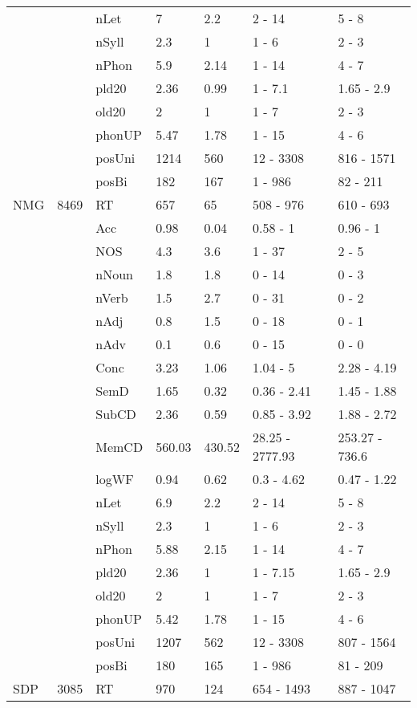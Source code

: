 \begin{table}[ht]
\begin{tabular}{lllllll}
   &  & nLet & 7 & 2.2 & 2 - 14 & 5 - 8 \\ 
   &  & nSyll & 2.3 & 1 & 1 - 6 & 2 - 3 \\ 
   &  & nPhon & 5.9 & 2.14 & 1 - 14 & 4 - 7 \\ 
   &  & pld20 & 2.36 & 0.99 & 1 - 7.1 & 1.65 - 2.9 \\ 
   &  & old20 & 2 & 1 & 1 - 7 & 2 - 3 \\ 
   &  & phonUP & 5.47 & 1.78 & 1 - 15 & 4 - 6 \\ 
   &  & posUni & 1214 & 560 & 12 - 3308 & 816 - 1571 \\ 
   &  & posBi & 182 & 167 & 1 - 986 & 82 - 211 \\ 
  NMG & 8469 & RT & 657 & 65 & 508 - 976 & 610 - 693 \\ 
   &  & Acc & 0.98 & 0.04 & 0.58 - 1 & 0.96 - 1 \\ 
   &  & NOS & 4.3 & 3.6 & 1 - 37 & 2 - 5 \\ 
   &  & nNoun & 1.8 & 1.8 & 0 - 14 & 0 - 3 \\ 
   &  & nVerb & 1.5 & 2.7 & 0 - 31 & 0 - 2 \\ 
   &  & nAdj & 0.8 & 1.5 & 0 - 18 & 0 - 1 \\ 
   &  & nAdv & 0.1 & 0.6 & 0 - 15 & 0 - 0 \\ 
   &  & Conc & 3.23 & 1.06 & 1.04 - 5 & 2.28 - 4.19 \\ 
   &  & SemD & 1.65 & 0.32 & 0.36 - 2.41 & 1.45 - 1.88 \\ 
   &  & SubCD & 2.36 & 0.59 & 0.85 - 3.92 & 1.88 - 2.72 \\ 
   &  & MemCD & 560.03 & 430.52 & 28.25 - 2777.93 & 253.27 - 736.6 \\ 
   &  & logWF & 0.94 & 0.62 & 0.3 - 4.62 & 0.47 - 1.22 \\ 
   &  & nLet & 6.9 & 2.2 & 2 - 14 & 5 - 8 \\ 
   &  & nSyll & 2.3 & 1 & 1 - 6 & 2 - 3 \\ 
   &  & nPhon & 5.88 & 2.15 & 1 - 14 & 4 - 7 \\ 
   &  & pld20 & 2.36 & 1 & 1 - 7.15 & 1.65 - 2.9 \\ 
   &  & old20 & 2 & 1 & 1 - 7 & 2 - 3 \\ 
   &  & phonUP & 5.42 & 1.78 & 1 - 15 & 4 - 6 \\ 
   &  & posUni & 1207 & 562 & 12 - 3308 & 807 - 1564 \\ 
   &  & posBi & 180 & 165 & 1 - 986 & 81 - 209 \\ 
  SDP & 3085 & RT & 970 & 124 & 654 - 1493 & 887 - 1047 \\ 

\end{tabular}
\end{table}
